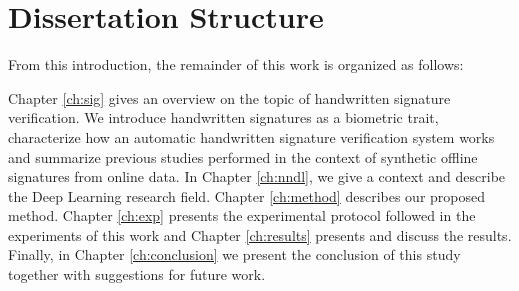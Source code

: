 \section{Dissertation Structure}
From this introduction, the remainder of this work is organized as follows:

Chapter \ref{ch:sig} gives an overview on the topic of handwritten signature verification. We introduce handwritten signatures as a biometric trait, characterize how an automatic handwritten signature verification system works and summarize previous studies performed in the context of synthetic offline signatures from online data. In Chapter \ref{ch:nndl}, we give a context and describe the  Deep Learning research field. Chapter \ref{ch:method} describes our proposed method. Chapter \ref{ch:exp} presents the experimental protocol followed in the experiments of this work and Chapter \ref{ch:results} presents and discuss the results. Finally, in Chapter \ref{ch:conclusion} we present the conclusion of this study together with suggestions for future work.
